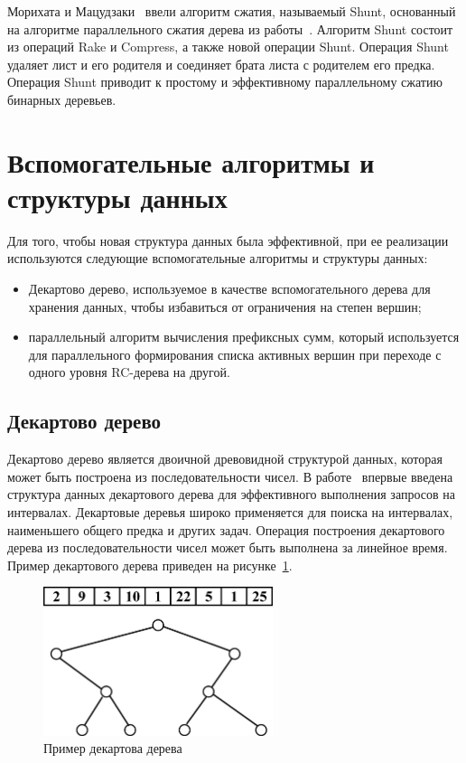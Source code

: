 \documentclass[specification,annotation]{itmo-student-thesis}
\begin{document}
Морихата и Мацудзаки~\cite{morihata08} ввели алгоритм сжатия, называемый Shunt, основанный на алгоритме параллельного сжатия дерева из 
работы~\cite{miller85}. Алгоритм Shunt состоит из операций Rake и Compress, а также новой операции Shunt. Операция Shunt удаляет лист и его родителя и 
соединяет брата листа с родителем его предка. Операция Shunt приводит к простому и эффективному параллельному сжатию бинарных деревьев.

\section{Вспомогательные алгоритмы и структуры данных}\label{survey-misc}

Для того, чтобы новая структура данных была эффективной, 
при ее реализации используются следующие вспомогательные алгоритмы и структуры данных:
\begin{itemize}
    \item Декартово дерево, используемое в качестве вспомогательного дерева для хранения данных, 
    чтобы избавиться от ограничения на степен вершин;
    \item параллельный алгоритм вычисления префиксных сумм, который
    используется для параллельного формирования списка активных вершин при переходе с одного 
    уровня RC-дерева на другой.
\end{itemize}
\subsection{Декартово дерево}

Декартово дерево является двоичной древовидной структурой данных, 
которая может быть построена из последовательности чисел. В работе~\cite{cartesian-tree} впервые 
введена структура данных декартового дерева для эффективного выполнения запросов на интервалах. 
Декартовые деревья широко применяется для поиска на интервалах, наименьшего общего предка и других 
задач. Операция построения декартового дерева из последовательности чисел может быть выполнена за 
линейное время. Пример декартового дерева приведен на рисунке~\ref{fig:cartesian-idea}.

\begin{figure}[!ht]
\centering
\includegraphics[width=0.6\textwidth]{pic/cartesian-tree-idea.png}
\caption{Пример декартова дерева}\label{fig:cartesian-idea}
\end{figure}
\end{document}
